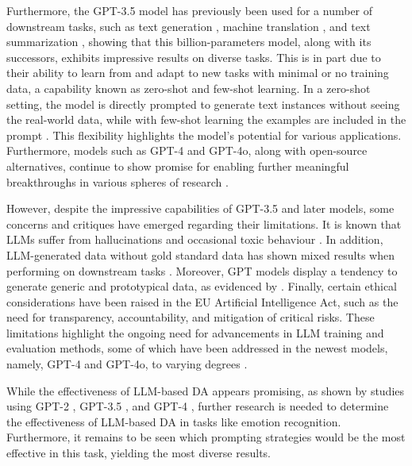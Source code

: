 \documentclass[manuscript]{clv3}
\begin{document}
Furthermore, the GPT-3.5 model has previously been used for a number of downstream tasks, such as text generation \cite{10.1145/3544548.3580688}, machine translation \cite{hendy2023goodgptmodelsmachine}, and text summarization \cite{shakil2024utilizinggptenhancetext}, showing that this billion-parameters model, along with its successors, exhibits impressive results on diverse tasks. This is in part due to their ability to learn from and adapt to new tasks with minimal or no training data, a capability known as zero-shot and few-shot learning. In a zero-shot setting, the model is directly prompted to generate text instances without seeing the real-world data, while with few-shot learning the examples are included in the prompt \cite{li2023synthetic}. This flexibility highlights the model's potential for various applications. Furthermore, models such as GPT-4 and GPT-4o, along with open-source alternatives, continue to show promise for enabling further meaningful breakthroughs in various spheres of research \cite{møller2023prompt}.

However, despite the impressive capabilities of GPT-3.5 and later models, some concerns and critiques have emerged regarding their limitations. It is known that LLMs suffer from hallucinations \cite{10.1145/3544548.3580688} and occasional toxic behaviour \cite{møller2023prompt}. In addition, LLM-generated data without gold standard data has shown mixed results when performing on downstream tasks \cite{li2023synthetic}. Moreover, GPT models display a tendency to generate generic and prototypical data, as evidenced by \citet{van-nooten-daelemans-2023-improving}. Finally, certain ethical considerations have been raised in the EU Artificial Intelligence Act, such as the need for transparency, accountability, and mitigation of critical risks. These limitations highlight the ongoing need for advancements in LLM training and evaluation methods, some of which have been addressed in the newest models, namely, GPT-4 and GPT-4o, to varying degrees \cite{openai2024gpt4technicalreport}. 

While the effectiveness of LLM-based DA appears promising, as shown by studies using GPT-2 \cite{zhang2020data}, GPT-3.5 \cite{van-nooten-daelemans-2023-improving}, and GPT-4 \cite{møller2023prompt}, further research is needed to determine the effectiveness of LLM-based DA in tasks like emotion recognition. Furthermore, it remains to be seen which prompting strategies would be the most effective in this task, yielding the most diverse results.
\end{document}
